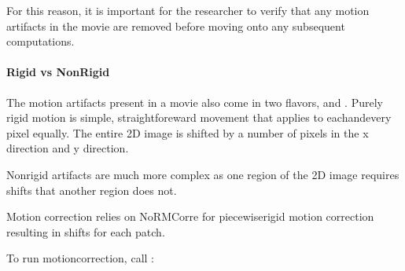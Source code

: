 \documentclass[letterpaper,10pt,english]{sphinxmanual}
\begin{document}
\sphinxAtStartPar
For this reason, it is  important for the researcher to verify that any motion artifacts in the movie are removed before moving onto any subsequent computations.


\paragraph{Rigid vs Non\sphinxhyphen{}Rigid}
\label{\detokenize{user_guide/pre_processing:rigid-vs-non-rigid}}
\sphinxAtStartPar
The motion artifacts present in a movie also come in two flavors,  and .
Purely rigid motion is simple, straightforeward movement that applies to each\sphinxhyphen{}and\sphinxhyphen{}every pixel equally.
The entire 2D image is shifted by a number of pixels in the x direction and y direction.

\sphinxAtStartPar
Non\sphinxhyphen{}rigid artifacts are much more complex as one region of the 2D image requires shifts that another region does not.

\sphinxAtStartPar
Motion correction relies on \label{\detokenize{user_guide/pre_processing:normcorre}}NoRMCorre for piecewise\sphinxhyphen{}rigid motion correction resulting in shifts for each patch.

\noindent{}

\sphinxAtStartPar
To run motion\sphinxhyphen{}correction, call :

\begin{sphinxVerbatim}[commandchars=\\\{\}]

\end{sphinxVerbatim}
\end{document}
